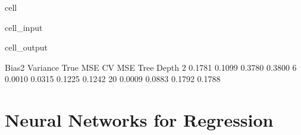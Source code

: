\documentclass[letterpaper,10pt,english]{jupyterBook}
\begin{document}
\begin{sphinxuseclass}{cell}
\begin{sphinxVerbatimInput}
\begin{sphinxuseclass}{cell_input}
\begin{sphinxVerbatim}[commandchars=\\\{\}]
    \PYG{p}{[}\PYG{p}{]}  
         
         
         
         

  
  
  
\end{sphinxVerbatim}

\end{sphinxuseclass}\end{sphinxVerbatimInput}
\begin{sphinxVerbatimOutput}

\begin{sphinxuseclass}{cell_output}
\begin{sphinxVerbatim}[commandchars=\\\{\}]
            Bias\PYGZca{}2  Variance  True MSE  CV MSE
Tree Depth                                    
2           0.1781    0.1099    0.3780  0.3800
6           0.0010    0.0315    0.1225  0.1242
20          0.0009    0.0883    0.1792  0.1788
\end{sphinxVerbatim}

\end{sphinxuseclass}\end{sphinxVerbatimOutput}

\end{sphinxuseclass}
\sphinxstepscope


\chapter{Neural Networks for Regression}
\label{\detokenize{04:neural-networks-for-regression}}\label{\detokenize{04::doc}}
\end{document}
